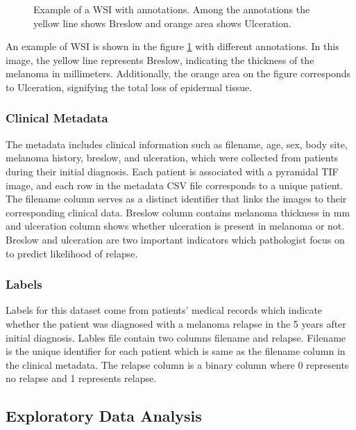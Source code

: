 \documentclass[conference]{IEEEtran}
\begin{document}
\begin{figure}[h!]
  \centering
    
  \caption{Example of a WSI with annotations. Among the annotations the yellow line shows Breslow and orange area shows Ulceration.}
  \label{fig:slide}
\end{figure}

An example of WSI is shown in the figure \ref{fig:slide} with different annotations.  In this image, the yellow line represents Breslow, indicating the thickness of the melanoma in millimeters. Additionally, the orange area on the figure corresponds to Ulceration, signifying the total loss of epidermal tissue.

\subsubsection{Clinical Metadata}
The metadata includes clinical information such as filename, age, sex, body site, melanoma history, breslow, and ulceration, which were collected from patients during their initial diagnosis. Each patient is associated with a pyramidal TIF image, and each row in the metadata CSV file corresponds to a unique patient. The filename column serves as a distinct identifier that links the images to their corresponding clinical data. Breslow column contains melanoma thickness in mm and ulceration column shows whether ulceration is present in melanoma or not. Breslow and ulceration are two important indicators which pathologist focus on to predict likelihood of relapse. 
\subsubsection{Labels}
Labels for this dataset come from patients' medical records which indicate whether the patient was diagnosed with a melanoma relapse in the 5 years after initial diagnosis. Lables file contain two columns filename and relapse. Filename is the unique identifier for each patient which is same as the filename column in the clinical metadata. The relapse column is a binary column where 0 represents no relapse and 1 represents relapse.

\subsection{Exploratory Data Analysis}
\end{document}
